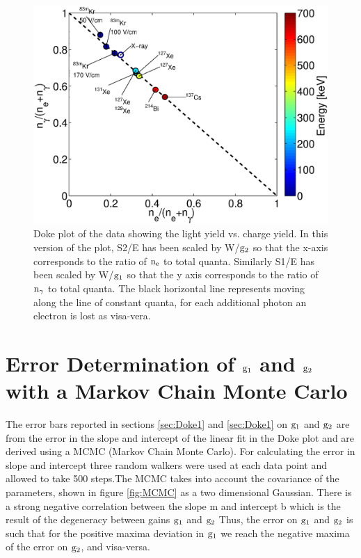  \begin{figure}[h!]\centering
\includegraphics[width=130mm]{Chapter_E_Scale/Figures/Doke_new/S1S2_Doke2_3.eps}
\caption{Doke plot of the data showing the light yield vs. charge yield. In this version of the plot, S2/E has been scaled by W/$\rm g_2$ so that the x-axis corresponds to the ratio of $\rm n_e$ to total quanta. Similarly S1/E has been scaled by W/$\rm g_1$ so that the y axis corresponds to the ratio of $\rm n_\gamma$ to total quanta. The black horizontal line represents moving along the line of constant quanta, for each additional photon an electron is lost as visa-vera.}
\label{fig:Doke_E}
\end{figure}

\newpage

\section{Error Determination of $\rm g_1$ and $\rm g_2$ with a Markov Chain Monte Carlo}
\label{sec:MCMC}
The error bars reported in sections \ref{sec:Doke1} and \ref{sec:Doke1} on $\rm g_1$ and $\rm g_2$ are from the error in the slope and intercept of the linear fit in the Doke plot and are derived using a MCMC (Markov Chain Monte Carlo). For calculating the error in slope and intercept  three random walkers were used at each data point and allowed to take 500 steps.The MCMC takes into account the covariance of the parameters, shown in figure \ref{fig:MCMC} as a two dimensional Gaussian. There is a strong negative correlation between the slope m and intercept b which is the result of the degeneracy between gains $\rm g_1$ and $\rm g_2$ Thus, the error on $\rm g_1$ and $\rm g_2$ is such that for the positive maxima deviation in $\rm g_1$ we reach the negative maxima of the error on $\rm g_2$, and visa-versa.


